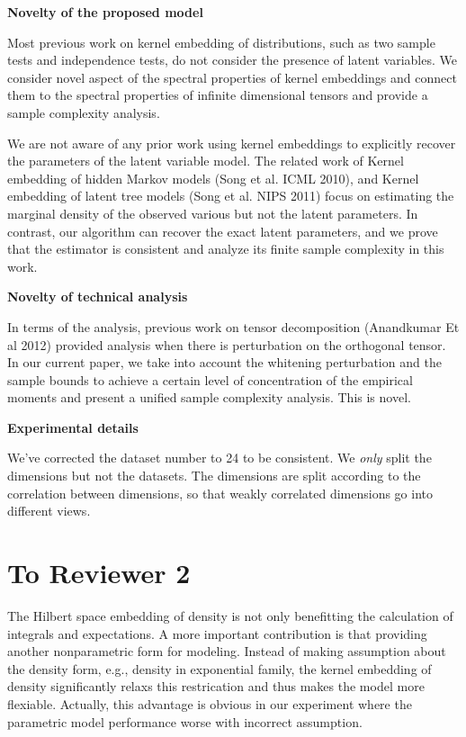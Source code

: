 \documentclass{article}
\begin{document}
\textbf{Novelty of the proposed model} 

Most previous work on kernel embedding of distributions, such as two sample tests and independence tests, do not consider the presence of latent variables. We consider novel aspect of the spectral properties of kernel embeddings and connect them to the spectral properties of infinite dimensional tensors and provide a sample complexity analysis. 

We are not aware of any prior work using kernel embeddings to explicitly recover the parameters of the latent variable model. The related work of Kernel embedding of hidden Markov models (Song et al. ICML 2010), and Kernel embedding of latent tree models (Song et al. NIPS 2011) focus on estimating the marginal density of the observed various but not the latent parameters. In contrast, our algorithm can recover the exact latent parameters, and we prove that the estimator is consistent and analyze its finite sample complexity in this work. 

\textbf{Novelty of technical analysis}

In terms of the analysis, previous work on tensor decomposition (Anandkumar Et al 2012) provided analysis when there is perturbation on the orthogonal tensor. In our current paper, we take into account the whitening perturbation and the sample bounds to achieve a certain level of concentration of the empirical moments and present a unified sample complexity analysis. This is novel. 

\textbf{Experimental details}

We've corrected the dataset number to 24 to be consistent. We \emph{only} split the dimensions but not the datasets. The dimensions are split according to the correlation between dimensions, so that weakly correlated dimensions go into different views.


\section*{To Reviewer 2}

The Hilbert space embedding of density is not only benefitting the calculation of integrals and expectations. A more important contribution is that providing another nonparametric form for modeling. Instead of making assumption about the density form, e.g., density in exponential family, the kernel embedding of density significantly relaxs this restrication and thus makes the model more flexiable. Actually, this advantage is obvious in our experiment where the parametric model performance worse with incorrect assumption. 
\end{document}
